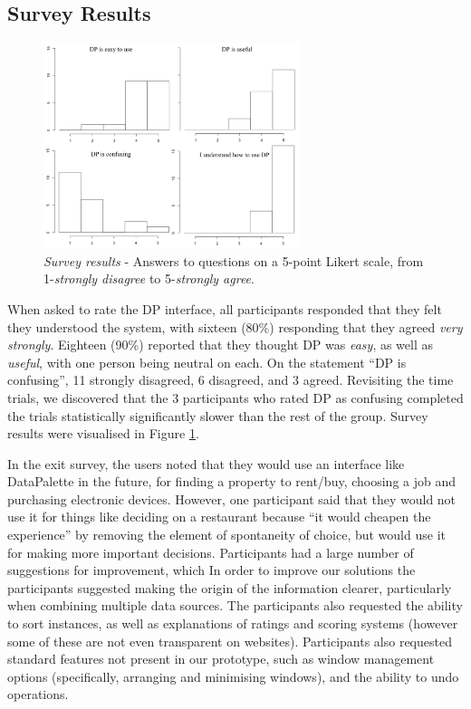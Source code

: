 \documentclass{sigchi}
\begin{document}
\subsection{Survey Results}


\begin{figure}[tbp]
\begin{center}
\includegraphics[width=7.5cm]{img/survey}
\caption{\emph{Survey results} - Answers to questions on a 5-point Likert scale, from 1-\emph{strongly disagree} to 5-\emph{strongly agree}.}
\label{fig:survey}
\end{center}
\end{figure}

When asked to rate the DP interface, all participants responded that they felt they understood the system, with sixteen (80\%) responding that they agreed \emph{very strongly}.  Eighteen (90\%) reported that they thought  DP was \emph{easy}, as well as \emph{useful}, with one person being neutral on each.  On the statement ``DP is confusing'',  11 strongly disagreed, 6 disagreed, and 3 agreed.  Revisiting the time trials, we discovered that the 3 participants who rated DP as confusing completed the trials statistically significantly slower than the rest of the group. Survey results were visualised in Figure \ref{fig:survey}.


In the exit survey, the users noted that they would use an interface like DataPalette in the future, for finding a property to rent/buy, choosing a job and purchasing electronic devices.  However, one participant said that they would not use it for things like deciding on a restaurant because ``it would cheapen the experience'' by removing the element of spontaneity of choice, but would use it for making more important decisions.  Participants had a large number of suggestions for improvement, which In order to improve our solutions the participants suggested making the origin of the information clearer, particularly when combining multiple data sources. The participants also requested the ability to sort instances, as well as explanations of ratings and scoring systems (however some of these are not even transparent on websites). Participants also requested standard features not present in our prototype, such as window management options (specifically, arranging and minimising windows), and the ability to undo operations.
\end{document}
